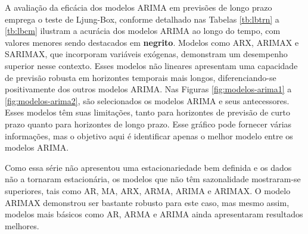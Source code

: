 


A avaliação da eficácia dos modelos ARIMA em previsões de longo prazo emprega o teste de Ljung-Box, conforme detalhado nas Tabelas \ref{tb:lbtrn} a \ref{tb:lbcm} ilustram a acurácia dos modelos ARIMA ao longo do tempo, com valores menores sendo destacados em \textbf{negrito}. Modelos como ARX, ARIMAX e SARIMAX, que incorporam variáveis exógenas, demonstram um desempenho superior nesse contexto. Esses modelos não lineares apresentam uma capacidade de previsão robusta em horizontes temporais mais longos, diferenciando-se positivamente dos outros modelos ARIMA. Nas Figuras \ref{fig:modelos-arima1} a \ref{fig:modelos-arima2}, são selecionados os modelos ARIMA e seus antecessores. Esses modelos têm suas limitações, tanto para horizontes de previsão de curto prazo quanto para horizontes de longo prazo. Esse gráfico pode fornecer várias informações, mas o objetivo aqui é identificar apenas o melhor modelo entre os modelos ARIMA.

Como essa série não apresentou uma estacionariedade bem definida e os dados não a tornaram estacionária, os modelos que não têm sazonalidade mostraram-se superiores, tais como AR, MA, ARX, ARMA, ARIMA e ARIMAX. O modelo ARIMAX demonstrou ser bastante robusto para este caso, mas mesmo assim, modelos mais básicos como AR, ARMA e ARIMA ainda apresentaram resultados melhores.

